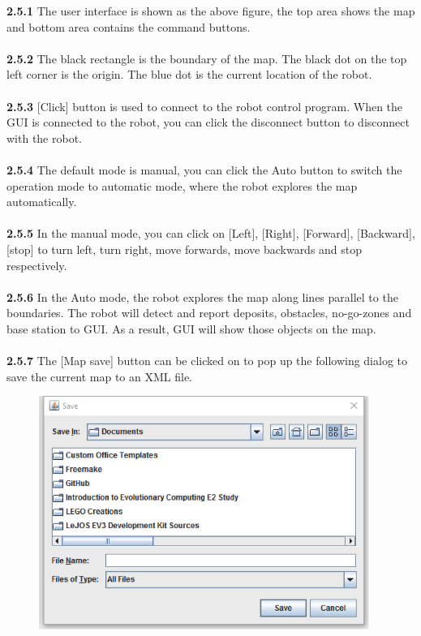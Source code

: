 \documentclass[11pt, a4paper]{article}
\begin{document}
\textbf{2.5.1} The user interface is shown as the above figure, the top area shows the map and bottom area contains the command buttons.\\
\\
\indent\textbf{2.5.2} The black rectangle is the boundary of the map. The black dot on the top left corner is the origin. The blue dot is the current location of the robot.\\
\\
\indent\textbf{2.5.3} [Click] button is used to connect to the robot control program.  When the GUI is connected to the robot, you can click the disconnect button to disconnect with the robot.\\
\\
\indent\textbf{2.5.4} The default mode is manual, you can click the Auto button to switch the operation mode to automatic mode, where the robot explores the map automatically. \\
\\
\indent\textbf{2.5.5} In the manual mode, you can click on [Left], [Right], [Forward], [Backward], [stop] to turn left, turn right, move forwards, move backwards and stop respectively.\\
\\
\indent\textbf{2.5.6} In the Auto mode, the robot explores the map along lines parallel to the boundaries. The robot will detect and report deposits, obstacles, no-go-zones and base station to GUI. As a result, GUI will show those objects on the map.\\
\\
\indent\textbf{2.5.7} The [Map save] button can be clicked on to pop up the following dialog to save the current map to an XML file.\\

\begin{figure}[H]
\centering
\includegraphics[height=3in]{UM3}
\end{figure}
\newpage
\end{document}
